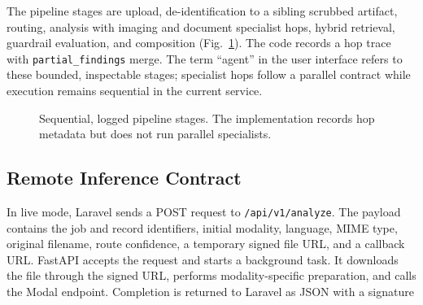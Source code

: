 \documentclass[conference]{IEEEtran}
\begin{document}
The pipeline stages are upload, de-identification to a sibling scrubbed artifact, routing, analysis with imaging and document specialist hops, hybrid retrieval, guardrail evaluation, and composition (Fig.~\ref{fig:pipeline}). The code records a hop trace with \texttt{partial\_findings} merge. The term ``agent'' in the user interface refers to these bounded, inspectable stages; specialist hops follow a parallel contract while execution remains sequential in the current service.

\begin{figure}[t]
\centering
{}
\caption{Sequential, logged pipeline stages. The implementation records hop metadata but does not run parallel specialists.}
\label{fig:pipeline}
\end{figure}

\subsection{Remote Inference Contract}

In live mode, Laravel sends a POST request to \texttt{/api/v1/analyze}. The payload contains the job and record identifiers, initial modality, language, MIME type, original filename, route confidence, a temporary signed file URL, and a callback URL. FastAPI accepts the request and starts a background task. It downloads the file through the signed URL, performs modality-specific preparation, and calls the Modal endpoint. Completion is returned to Laravel as JSON with a signature
\end{document}
